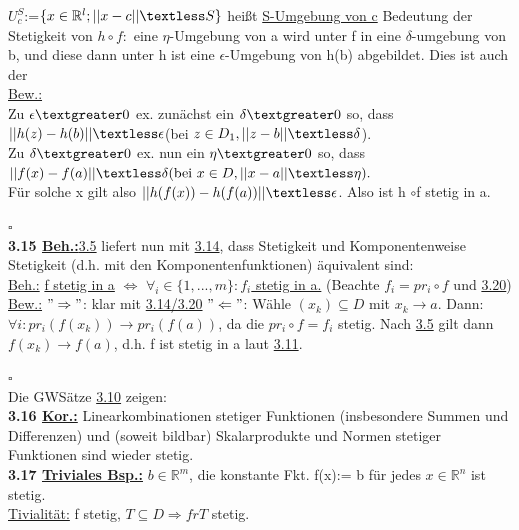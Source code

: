 \documentclass[]{scrartcl}
\begin{document}
	\ul{$U^S_c$}:=\ul{$\{x\in \mathbb{R}^l; ||x-c||\textless 
	S\}$} heißt \ul{S-Umgebung von c} Bedeutung der Stetigkeit von $h\circ f:$ 
	eine $\eta$-Umgebung von a wird unter f in eine $\delta$-umgebung von b, 
	und diese dann unter h ist eine $\epsilon$-Umgebung von h(b) abgebildet. 
	Dies ist auch der\\
	\underline{Bew.:}\\
	Zu $\epsilon\textgreater 0$ ex. zunächst ein $\delta \textgreater 0$ so, 
	dass $||h(z)-h(b)|| \textless \epsilon$(bei $z \in D_1, ||z-b|| \textless 
	\delta$).\\
	Zu $\delta\textgreater 0$ ex. nun ein $\eta \textgreater 0$ so, dass 
	$||f(x)-f(a)||\textless \delta (\text{bei } x\in D ,|| x-a||\textless 
	\eta).$\\
	Für solche x gilt also $||h(f(x))-h(f(a))||\textless \epsilon$. Also ist h 
	$\circ$f stetig in a.\\
	\strut\hfill$\square$\\
	\textbf{3.15 \underline{Beh.:}}\ul{3.5} liefert nun mit  
	\ul{3.14}, dass Stetigkeit und Komponentenweise Stetigkeit (d.h. mit den 
	Komponentenfunktionen) äquivalent sind:\\
	\underline{Beh.:} \ul{f stetig in a} $\Leftrightarrow$ 
	\ul{$\forall_i \in \{1,...,m\}:f_i$ stetig in a.} (Beachte $f_i=pr_i\circ 
	f$ und \ul{3.20})\\
	\underline{Bew.:} $"\Rightarrow"$: klar mit \ul{3.14/3.20} $"\Leftarrow"$: 
	Wähle $(x_k) \subseteq D$ mit $x_k\rightarrow a.$ Dann:\\
	$\forall i: pr_i(f(x_k))\rightarrow pr_i(f(a))$, da die $pr_i\circ f=f_i$ 
	stetig. Nach \ul{3.5} gilt dann $f(x_k)\rightarrow f(a)$, d.h. f ist stetig 
	in a laut \ul{3.11}.\\
	\strut\hfill$\square$\\
	Die GWSätze \ul{3.10} zeigen:\\
	\textbf{3.16 \underline{Kor.:}} Linearkombinationen stetiger Funktionen 
	(insbesondere Summen und Differenzen) und (soweit bildbar) Skalarprodukte 
	und Normen stetiger Funktionen sind wieder stetig.\\
	\textbf{3.17 \underline{Triviales Bsp.:}} $b\in\mathbb{R}^m$, die konstante 
	Fkt. f(x):= b für jedes $x\in\mathbb{R}^n$ ist stetig.\\
	\underline{Tivialität:} f stetig, $T\subseteq D\Rightarrow f r T$ stetig.\\
	\\
\end{document}
